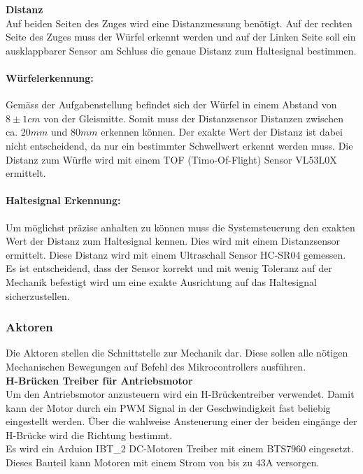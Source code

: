 \documentclass[../../main.tex]{subfiles}
\begin{document}
    \textbf{Distanz}\\
    Auf beiden Seiten des Zuges wird eine Distanzmessung benötigt. Auf der rechten Seite des Zuges muss der Würfel erkennt werden und auf der Linken Seite soll ein ausklappbarer Sensor am Schluss die genaue Distanz zum Haltesignal bestimmen.

    \paragraph{Würfelerkennung:}
    Gemäss der Aufgabenstellung befindet sich der Würfel in einem Abstand von $8\pm1cm$ von der Gleismitte. Somit muss der Distanzsensor Distanzen zwischen ca. $20mm$ und $80mm$ erkennen können. Der exakte Wert der Distanz ist dabei nicht entscheidend, da nur ein bestimmter Schwellwert erkennt werden muss. Die Distanz zum Würfle wird mit einem TOF (Timo-Of-Flight) Sensor VL53L0X ermittelt.

    \paragraph{Haltesignal Erkennung:}
    Um möglichst präzise anhalten zu können muss die Systemsteuerung den exakten Wert der Distanz zum Haltesignal kennen. Dies wird mit einem Distanzsensor ermittelt. Diese Distanz wird mit einem Ultraschall Sensor HC-SR04 gemessen. Es ist entscheidend, dass der Sensor korrekt und mit wenig Toleranz auf der Mechanik befestigt wird um eine exakte Ausrichtung auf das Haltesignal sicherzustellen.

    \subsubsection{Aktoren}
    Die Aktoren stellen die Schnittstelle zur Mechanik dar. Diese sollen alle nötigen Mechanischen Bewegungen auf Befehl des Mikrocontrollers ausführen.\\

    \textbf{H-Brücken Treiber für Antriebsmotor}\\
    Um den Antriebsmotor anzusteuern wird ein H-Brückentreiber verwendet. Damit kann der Motor durch ein PWM Signal in der Geschwindigkeit fast beliebig eingestellt werden. Über die wahlweise Ansteuerung einer der beiden eingänge der H-Brücke wird die Richtung bestimmt.\\
    Es wird ein Arduion IBT\_2 DC-Motoren Treiber mit einem BTS7960 eingesetzt. Dieses Bauteil kann Motoren mit einem Strom von bis zu 43A versorgen. \\
\end{document}
